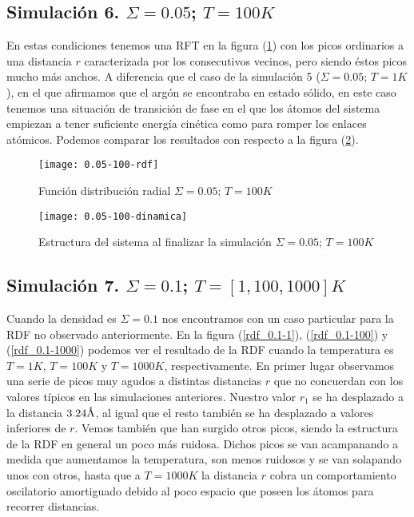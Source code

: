 \subsection{Simulación 6. $\Sigma=0.05$; $T=100K$}

En estas condiciones tenemos una RFT en la figura (\ref{rdf_0.05-100}) con los picos ordinarios a una distancia $r$ caracterizada por los consecutivos vecinos, pero siendo éstos picos mucho más anchos. A diferencia que el caso de la simulación 5 ($\Sigma=0.05$; $T=1K$), en el que afirmamos que el argón se encontraba en estado sólido, en este caso tenemos una situación de transición de fase en el que los átomos del sistema empiezan a tener suficiente energía cinética como para romper los enlaces atómicos. Podemos comparar los resultados con respecto a la figura (\ref{dinamica_0.05-100}).

\begin{figure}[t]
	\texttt{[image: 0.05-100-rdf]}
	\caption{Función distribución radial $\Sigma=0.05$; $T=100K$}
	\label{rdf_0.05-100}
\end{figure}

\begin{figure}[t]
	\texttt{[image: 0.05-100-dinamica]}
	\caption{Estructura del sistema al finalizar la simulación $\Sigma=0.05$; $T=100K$}
	\label{dinamica_0.05-100}
\end{figure}

\subsection{Simulación 7. $\Sigma=0.1$; $T= [1,100,1000]K$}

Cuando la densidad es $\Sigma=0.1$ nos encontramos con un caso particular para la RDF no observado anteriormente. En la figura (\ref{rdf_0.1-1}), (\ref{rdf_0.1-100}) y (\ref{rdf_0.1-1000}) podemos ver el resultado de la RDF cuando la temperatura es $T= 1K$, $T= 100K$ y $T= 1000K$, respectivamente. En primer lugar observamos una serie de picos muy agudos a distintas distancias $r$ que no concuerdan con los valores típicos en las simulaciones anteriores. Nuestro valor $r_1$ se ha desplazado a la distancia $3.24\textup{\r{A}}$, al igual que el resto también se ha desplazado a valores inferiores de $r$. Vemos también que han surgido otros picos, siendo la estructura de la RDF en general un poco más ruidosa. Dichos picos se van acampanando a medida que aumentamos la temperatura, son menos ruidosos y se van solapando unos con otros, hasta que a $T=1000K$ la distancia $r$ cobra un comportamiento oscilatorio amortiguado debido al poco espacio que poseen los átomos para recorrer distancias.

